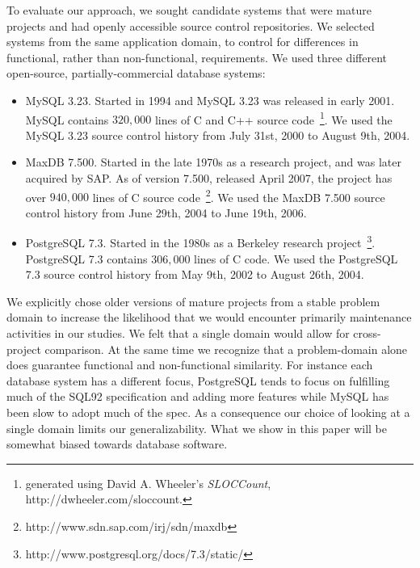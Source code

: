 \documentclass[smallextended]{svjour3}       %
\begin{document}
To evaluate our approach, we sought candidate systems that were mature projects and had openly accessible source control repositories. 
We selected systems from the same application domain, to control for differences in functional, rather than non-functional, requirements. 
We used three different open-source, partially-commercial database systems:
\begin{itemize}
\item  MySQL 3.23. Started in 1994 and MySQL 3.23 was released in early 2001. MySQL contains $320,000$ lines of C and C++ source code~\footnote{generated
using David A. Wheeler's \emph{SLOCCount},
{http://dwheeler.com/sloccount}.}. We used the MySQL 3.23 source control  history from July
31st, 2000 to August 9th, 2004.
\item MaxDB 7.500. Started in the late 1970s as a research project, and was later acquired by SAP. As of version 7.500, released April 2007, the project
has over $940,000$ lines of C source
code~\footnote{{http://www.sdn.sap.com/irj/sdn/maxdb}}. 
 We used the MaxDB 7.500 source control history from June
29th, 2004 to June 19th, 2006.
\item PostgreSQL 7.3. Started in the 1980s as a Berkeley research
  project~\footnote{{http://www.postgresql.org/docs/7.3/static/}}. PostgreSQL
  7.3 contains $306,000$ lines of C code.
 We used the PostgreSQL 7.3 source control  history from May 9th, 2002 to 
 August 26th, 2004.

\end{itemize}
  
We explicitly chose older versions of mature projects from a stable problem domain to increase the likelihood that we would encounter primarily
maintenance activities in our studies. We felt that a single domain
would allow for cross-project comparison. At the same time we
recognize that a problem-domain alone does guarantee functional and
non-functional similarity.
For instance each database system has a different focus, PostgreSQL
tends to focus on fulfilling much of the SQL92 specification and adding
more features while MySQL has been slow to adopt much of the spec.
 As a consequence our choice of looking at a
single domain limits our generalizability. What we show in this paper
will be somewhat biased towards database software.
\end{document}
